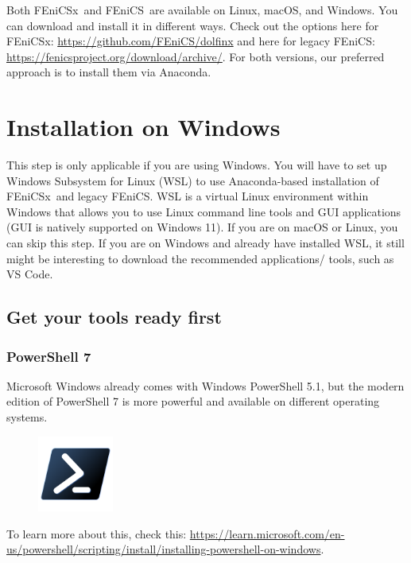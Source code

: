 \documentclass[12pt]{article}
\newcommand{\fenics}{\textsf{FEniCS}}
\newcommand{\fenicsx}{\textsf{FEniCSx}}
\begin{document}
Both \fenicsx \ and \fenics \ are available on Linux, macOS, and Windows. You can download and install it in different ways. Check out the options here for \fenicsx: \url{https://github.com/FEniCS/dolfinx} and here for legacy \fenics: \url{https://fenicsproject.org/download/archive/}. For both versions, our preferred approach is to install them via Anaconda.


\section*{Installation on Windows} 

This step is only applicable if you are using Windows. You will have to set up Windows Subsystem for Linux (WSL) to use Anaconda-based installation of \fenicsx \ and legacy \fenics. WSL is a virtual Linux environment within Windows that allows you to use Linux command line tools and GUI applications (GUI is natively supported on Windows 11). If you are on macOS or Linux, you can skip this step. If you are on Windows and already have installed WSL, it still might be interesting to download the recommended applications/ tools, such as VS Code.

\subsection*{Get your tools ready first}

\subsubsection*{PowerShell 7}

Microsoft Windows already comes with Windows PowerShell 5.1, but the modern edition of PowerShell 7 is more powerful and available on different operating systems. 

\begin{figure}[H]
    \centering
    \includegraphics[width=2.5cm,trim={0 1.5cm 0 1.5cm},clip]{powershell-logo.png}
\end{figure}
To learn more about this, check this:
\url{https://learn.microsoft.com/en-us/powershell/scripting/install/installing-powershell-on-windows}.
\end{document}
